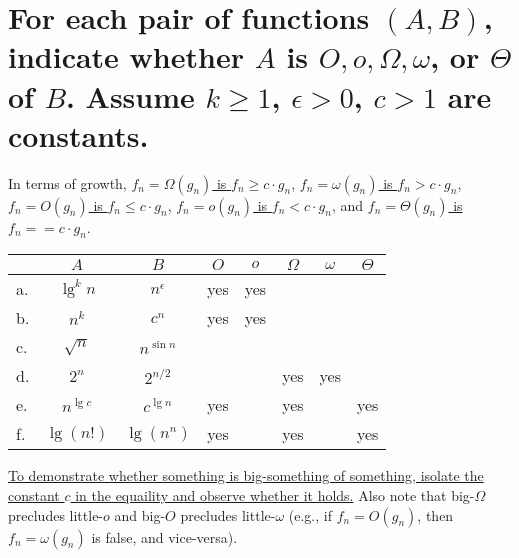\section[Problem 5]{For each pair of functions $(A, B)$, indicate whether $A$ is $O, o, \Omega, \omega$, or $\Theta$ of $B$. Assume $k \geq 1$, $\epsilon > 0$, $c > 1$ are constants.}

In terms of growth,
\ul{$f_n = \Omega(g_n)$ is	$f_n \geq c \cdot g_n$},
\ul{$f_n = \omega(g_n)$ is	$f_n > c \cdot g_n$},
\ul{$f_n = O(g_n)$ is		$f_n \leq c \cdot g_n$},
\ul{$f_n = o(g_n)$ is		$f_n < c \cdot g_n$}, and
\ul{$f_n = \Theta(g_n)$ is	$f_n == c \cdot g_n$}. 

\begin{center}
	\begin{tabular}{lcc|c|c|c|c|c}
		& $A$ & $B$ & $O$ & $o$ & $\Omega$ & $\omega$ & $\Theta$ \\ \hline
		a. & $\lg^k n$ & $n^{\epsilon}$ & yes & yes &  &  &  \\ \hline
		b. & $n^k$ & $c^n$				& yes & yes &  &  &  \\ \hline
		c. & $\sqrt{n}$ & $n^{\sin n}$	&  &  &  &  &  \\ \hline
		d. & $2^n$ & $2^{n/2}$			&  &  & yes & yes &  \\ \hline
		e. & $n^{\lg c}$ & $c^{\lg n}$	& yes &  & yes &  & yes \\ \hline
		f. & $\lg(n!)$ & $\lg(n^n)$		& yes &  & yes &  & yes 
	\end{tabular}
\end{center}

\ul{To demonstrate whether something is big-something of something, isolate the constant $c$ in the equaility and observe whether it holds.} Also note that big-$\Omega$ precludes little-$o$ and big-$O$ precludes little-$\omega$ (e.g., if $f_n = O(g_n)$, then $f_n = \omega(g_n)$ is false, and vice-versa).
